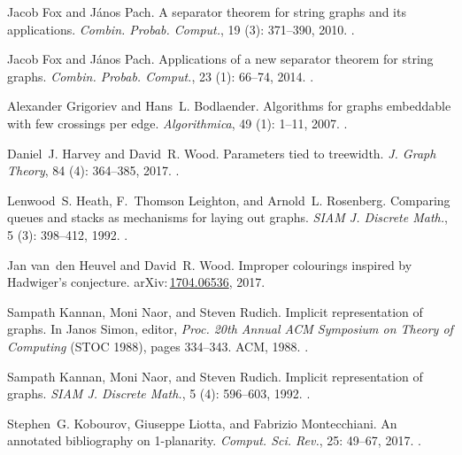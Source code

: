 \documentclass{patmorin}
\newcommand{\arXiv}[1]{arXiv:\,\href{https://arxiv.org/abs/#1}{#1}}
\begin{document}
\begin{thebibliography}{37}
	Jacob Fox and J{\'a}nos Pach.
	\newblock A separator theorem for string graphs and its applications.
	\newblock \emph{Combin. Probab. Comput.}, 19 (3): 371--390,
	2010.
	\newblock {}.
	
	Jacob Fox and J{\'a}nos Pach.
	\newblock Applications of a new separator theorem for string graphs.
	\newblock \emph{Combin. Probab. Comput.}, 23 (1): 66--74,
	2014.
	\newblock {}.
	
	Alexander Grigoriev and Hans~L. Bodlaender.
	\newblock Algorithms for graphs embeddable with few crossings per edge.
	\newblock \emph{Algorithmica}, 49 (1): 1--11, 2007.
	\newblock {}.
	
	Daniel~J. Harvey and David~R. Wood.
	\newblock Parameters tied to treewidth.
	\newblock \emph{J. Graph Theory}, 84 (4): 364--385, 2017.
	\newblock {}.
	
	Lenwood~S. Heath, F.~Thomson Leighton, and Arnold~L. Rosenberg.
	\newblock Comparing queues and stacks as mechanisms for laying out graphs.
	\newblock \emph{SIAM J. Discrete Math.}, 5 (3): 398--412,
	1992.
	\newblock {}.
	
	Jan van~den Heuvel and David~R. Wood.
	\newblock Improper colourings inspired by {H}adwiger's conjecture.
	\newblock \arXiv{1704.06536}, 2017.
	
	Sampath Kannan, Moni Naor, and Steven Rudich.
	\newblock Implicit representation of graphs.
	\newblock In Janos Simon, editor, \emph{Proc. 20th Annual {ACM} Symposium on Theory of Computing} (STOC 1988), pages 334--343. {ACM}, 1988.
	\newblock {}.
	
	Sampath Kannan, Moni Naor, and Steven Rudich.
	\newblock Implicit representation of graphs.
	\newblock \emph{{SIAM} J. Discrete Math.}, 5 (4): 596--603,
	1992.
	\newblock {}.
	
	Stephen~G. Kobourov, Giuseppe Liotta, and Fabrizio Montecchiani.
	\newblock An annotated bibliography on 1-planarity.
	\newblock \emph{Comput. Sci. Rev.}, 25: 49--67, 2017.
	\newblock {}.
	

\end{thebibliography}
\end{document}
